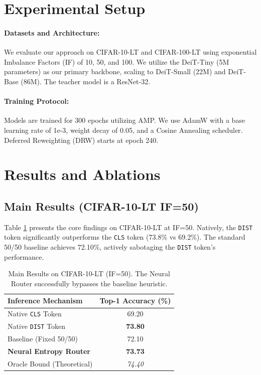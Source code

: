 \documentclass[10pt,twocolumn,letterpaper]{article}
\begin{document}
\section{Experimental Setup}

\paragraph{Datasets and Architecture:} We evaluate our approach on CIFAR-10-LT and CIFAR-100-LT using exponential Imbalance Factors (IF) of 10, 50, and 100. We utilize the DeiT-Tiny (5M parameters) as our primary backbone, scaling to DeiT-Small (22M) and DeiT-Base (86M). The teacher model is a ResNet-32.

\paragraph{Training Protocol:} Models are trained for 300 epochs utilizing AMP. We use AdamW with a base learning rate of 1e-3, weight decay of 0.05, and a Cosine Annealing scheduler. Deferred Reweighting (DRW) starts at epoch 240. 

\section{Results and Ablations}

\subsection{Main Results (CIFAR-10-LT IF=50)}

Table \ref{tab:main_results} presents the core findings on CIFAR-10-LT at IF=50. Natively, the \texttt{DIST} token significantly outperforms the \texttt{CLS} token (73.8\% vs 69.2\%). The standard 50/50 baseline achieves 72.10\%, actively sabotaging the \texttt{DIST} token's performance.

\begin{table}[h]
\centering
\begin{tabular}{lc}
\toprule
\textbf{Inference Mechanism} & \textbf{Top-1 Accuracy (\%)} \\
\midrule
Native \texttt{CLS} Token & 69.20 \\
Native \texttt{DIST} Token & \textbf{73.80} \\
\midrule
Baseline (Fixed 50/50) & 72.10 \\
\textbf{Neural Entropy Router} & \textbf{73.73} \\
\midrule
Oracle Bound (Theoretical) & \textit{74.40} \\
\bottomrule
\end{tabular}
\caption{Main Results on CIFAR-10-LT (IF=50). The Neural Router successfully bypasses the baseline heuristic.}
\label{tab:main_results}
\end{table}
\end{document}
